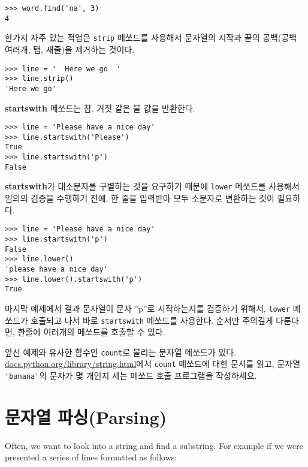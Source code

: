 \beforeverb
\begin{verbatim}
>>> word.find('na', 3)
4
\end{verbatim}
\afterverb
%

한가지 자주 있는 적업은 {\tt strip} 메쏘드를 사용해서 문자열의 시작과 끝의 공백(공백 여러개, 탭, 새줄)을 제거하는 것이다.

\beforeverb
\begin{verbatim}
>>> line = '  Here we go  '
>>> line.strip()
'Here we go'
\end{verbatim}
\afterverb
%

{\bf startswith} 메쏘드는 참, 거짓 같은 불 값을 반환한다.

\beforeverb
\begin{verbatim}
>>> line = 'Please have a nice day'
>>> line.startswith('Please')
True
>>> line.startswith('p')
False
\end{verbatim}
\afterverb
%

{\bf startswith}가 대소문자를 구별하는 것을 요구하기 때문에 {\tt lower} 메쏘드를 사용해서 임의의 검증을 수행하기 전에, 
한 줄을 입력받아 모두 소문자로 변환하는 것이 필요하다.

\beforeverb
\begin{verbatim}
>>> line = 'Please have a nice day'
>>> line.startswith('p')
False
>>> line.lower()
'please have a nice day'
>>> line.lower().startswith('p')
True
\end{verbatim}
\afterverb
%

마지막 예제에서 결과 문자열이 문자 ''p''로 시작하는지를 검증하기 위해서, 
{\tt lower} 메쏘드가 호출되고 나서 바로 {\tt startswith} 메쏘드를 사용한다.
순서만 주의깊게 다룬다면, 한줄에 여러개의 메쏘드를 호출할 수 있다.

\begin{ex}

앞선 예제와 유사한 함수인 {\tt count}로 불리는 문자열 메쏘드가 있다.
\url{docs.python.org/library/string.html}에서 {\tt count} 메쏘드에 대한 문서를 읽고,
문자열 \verb"'banana'"의 문자가 몇 개인지 세는 메쏘드 호출 프로그램을 작성하세요.

\end{ex}

\section{문자열 파싱(Parsing)}

Often, we want to look into a string and find a substring.  For example
if we were presented a series of lines formatted as follows:


